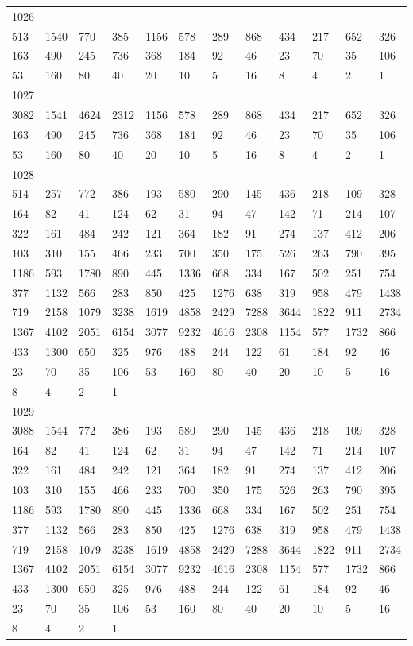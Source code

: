 \begin{longtable}{llllllllllll}
1026&&&&&&&&&&&\\
513& 1540& 770& 385& 1156& 578& 289& 868& 434& 217& 652& 326\\
163& 490& 245& 736& 368& 184& 92& 46& 23& 70& 35& 106\\
53& 160& 80& 40& 20& 10& 5& 16& 8& 4& 2& 1\\

1027&&&&&&&&&&&\\
3082& 1541& 4624& 2312& 1156& 578& 289& 868& 434& 217& 652& 326\\
163& 490& 245& 736& 368& 184& 92& 46& 23& 70& 35& 106\\
53& 160& 80& 40& 20& 10& 5& 16& 8& 4& 2& 1\\

1028&&&&&&&&&&&\\
514& 257& 772& 386& 193& 580& 290& 145& 436& 218& 109& 328\\
164& 82& 41& 124& 62& 31& 94& 47& 142& 71& 214& 107\\
322& 161& 484& 242& 121& 364& 182& 91& 274& 137& 412& 206\\
103& 310& 155& 466& 233& 700& 350& 175& 526& 263& 790& 395\\
1186& 593& 1780& 890& 445& 1336& 668& 334& 167& 502& 251& 754\\
377& 1132& 566& 283& 850& 425& 1276& 638& 319& 958& 479& 1438\\
719& 2158& 1079& 3238& 1619& 4858& 2429& 7288& 3644& 1822& 911& 2734\\
1367& 4102& 2051& 6154& 3077& 9232& 4616& 2308& 1154& 577& 1732& 866\\
433& 1300& 650& 325& 976& 488& 244& 122& 61& 184& 92& 46\\
23& 70& 35& 106& 53& 160& 80& 40& 20& 10& 5& 16\\
8& 4& 2& 1& \\

1029&&&&&&&&&&&\\
3088& 1544& 772& 386& 193& 580& 290& 145& 436& 218& 109& 328\\
164& 82& 41& 124& 62& 31& 94& 47& 142& 71& 214& 107\\
322& 161& 484& 242& 121& 364& 182& 91& 274& 137& 412& 206\\
103& 310& 155& 466& 233& 700& 350& 175& 526& 263& 790& 395\\
1186& 593& 1780& 890& 445& 1336& 668& 334& 167& 502& 251& 754\\
377& 1132& 566& 283& 850& 425& 1276& 638& 319& 958& 479& 1438\\
719& 2158& 1079& 3238& 1619& 4858& 2429& 7288& 3644& 1822& 911& 2734\\
1367& 4102& 2051& 6154& 3077& 9232& 4616& 2308& 1154& 577& 1732& 866\\
433& 1300& 650& 325& 976& 488& 244& 122& 61& 184& 92& 46\\
23& 70& 35& 106& 53& 160& 80& 40& 20& 10& 5& 16\\
8& 4& 2& 1& \\


\end{longtable}

